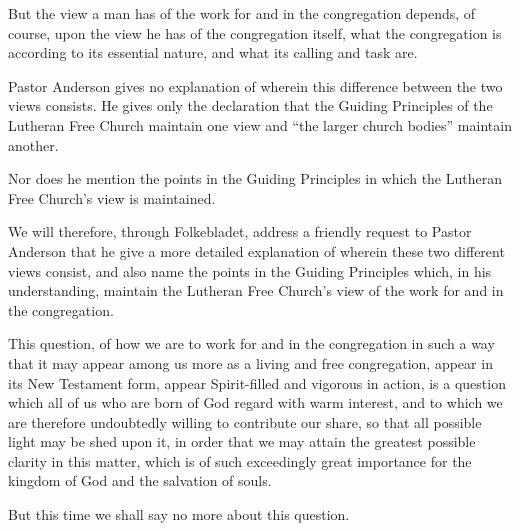 But the view a man has of the work for and in the congregation depends, of course, upon the view he has of the congregation itself, what the congregation is according to its essential nature, and what its calling and task are.

Pastor Anderson gives no explanation of wherein this difference between the two views consists. He gives only the declaration that the Guiding Principles of the Lutheran Free Church maintain one view and “the larger church bodies” maintain another.

Nor does he mention the points in the Guiding Principles in which the Lutheran Free Church’s view is maintained.

We will therefore, through Folkebladet, address a friendly request to Pastor Anderson that he give a more detailed explanation of wherein these two different views consist, and also name the points in the Guiding Principles which, in his understanding, maintain the Lutheran Free Church’s view of the work for and in the congregation.

This question, of how we are to work for and in the congregation in such a way that it may appear among us more as a living and free congregation, appear in its New Testament form, appear Spirit-filled and vigorous in action, is a question which all of us who are born of God regard with warm interest, and to which we are therefore undoubtedly willing to contribute our share, so that all possible light may be shed upon it, in order that we may attain the greatest possible clarity in this matter, which is of such exceedingly great importance for the kingdom of God and the salvation of souls.

But this time we shall say no more about this question.